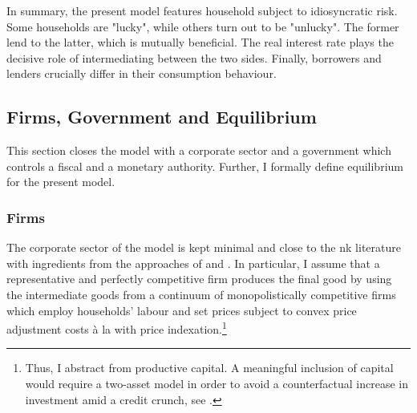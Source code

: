 \documentclass[12pt]{article} %
\numberwithin{equation}{section} %
\numberwithin{figure}{section}
\numberwithin{table}{section}
\begin{document}
In summary, the present model features household subject to idiosyncratic risk. Some households are "lucky", while others turn out to be "unlucky". The former lend to the latter, which is mutually beneficial. The real interest rate plays the decisive role of intermediating between the two sides. Finally, borrowers and lenders crucially differ in their consumption behaviour.


\subsection{Firms, Government and Equilibrium}
\label{sec:model-sectors}

This section closes the model with a corporate sector and a government which controls a fiscal and a monetary authority. Further, I formally define equilibrium for the present model.

\subsubsection{Firms}
\label{sec:model-firms}

The corporate sector of the model is kept minimal and close to the \Gls{nk} literature with ingredients from the approaches of \textcite{mckay2016} and \textcite{gust2017wp}. In particular, I assume that a representative and perfectly competitive firm produces the final good by using the intermediate goods from a continuum of monopolistically competitive firms which employ households' labour and set prices subject to convex price adjustment costs à la \textcite{rotemberg1982} with price indexation.\footnote{Thus, I abstract from productive capital. A meaningful inclusion of capital would require a two-asset model in order to avoid a counterfactual increase in investment amid a credit crunch, see \textcite{kv2018}.}
\end{document}
